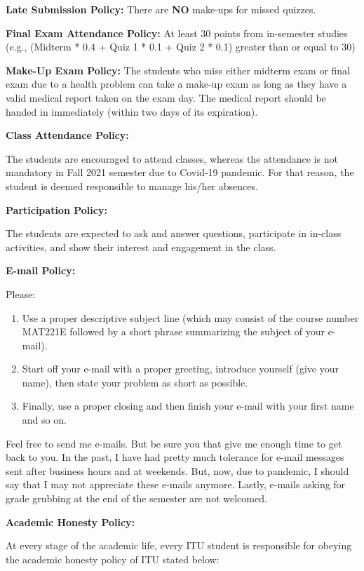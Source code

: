 \documentclass[
  12pt,
]{article}
\providecommand{\tightlist}{%
  \setlength{\itemsep}{0pt}\setlength{\parskip}{0pt}}
\begin{document}
\textbf{Late Submission Policy:} There are \textbf{NO} make-ups for
missed quizzes.

\textbf{Final Exam Attendance Policy:} At least 30 points from
in-semester studies (e.g., (Midterm * 0.4 + Quiz 1 * 0.1 + Quiz 2 * 0.1)
greater than or equal to 30)

\textbf{Make-Up Exam Policy:} The students who miss either midterm exam
or final exam due to a health problem can take a make-up exam as long as
they have a valid medical report taken on the exam day. The medical
report should be handed in immediately (within two days of its
expiration).

\textbf{Class Attendance Policy:}

The students are encouraged to attend classes, whereas the attendance is
not mandatory in Fall 2021 semester due to Covid-19 pandemic. For that
reason, the student is deemed responsible to manage his/her absences.

\textbf{Participation Policy:}

The students are expected to ask and answer questions, participate in
in-class activities, and show their interest and engagement in the
class.

\textbf{E-mail Policy:}

Please:

\begin{enumerate}
\def\labelenumi{\arabic{enumi}.}
\tightlist
\item
  Use a proper descriptive subject line (which may consist of the course
  number MAT221E followed by a short phrase summarizing the subject of
  your e-mail).
\item
  Start off your e-mail with a proper greeting, introduce yourself (give
  your name), then state your problem as short as possible.
\item
  Finally, use a proper closing and then finish your e-mail with your
  first name and so on.
\end{enumerate}

Feel free to send me e-mails. But be sure you that give me enough time
to get back to you. In the past, I have had pretty much tolerance for
e-mail messages sent after business hours and at weekends. But, now, due
to pandemic, I should say that I may not appreciate these e-mails
anymore. Lastly, e-mails asking for grade grubbing at the end of the
semester are not welcomed.

\textbf{Academic Honesty Policy:}

At every stage of the academic life, every ITU student is responsible
for obeying the academic honesty policy of ITU stated below:
\end{document}
